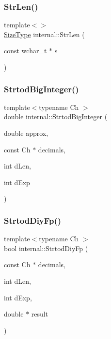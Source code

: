 \mbox{\label{namespaceinternal_a9cd1cee166f1e18e117d3ce9dc1c83da}} 
\subsubsection{\texorpdfstring{Str\+Len()}{StrLen()}\hspace{0.1cm}{\footnotesize\ttfamily [3/3]}}
{\footnotesize\ttfamily template$<$$>$ \\
\hyperlink{rapidjson_8h_a5ed6e6e67250fadbd041127e6386dcb5}{Size\+Type} internal\+::\+Str\+Len (\begin{DoxyParamCaption}\item[{const wchar\+\_\+t $\ast$}]{s }\end{DoxyParamCaption})\hspace{0.3cm}{\ttfamily [inline]}}

\mbox{\label{namespaceinternal_aa69b729bd9d047f70ba772424cfb65cb}} 
\subsubsection{\texorpdfstring{Strtod\+Big\+Integer()}{StrtodBigInteger()}}
{\footnotesize\ttfamily template$<$typename Ch $>$ \\
double internal\+::\+Strtod\+Big\+Integer (\begin{DoxyParamCaption}\item[{double}]{approx,  }\item[{const Ch $\ast$}]{decimals,  }\item[{int}]{d\+Len,  }\item[{int}]{d\+Exp }\end{DoxyParamCaption})\hspace{0.3cm}{\ttfamily [inline]}}

\mbox{\label{namespaceinternal_aab0ac7e895939a3e117ec8e3395fd334}} 
\subsubsection{\texorpdfstring{Strtod\+Diy\+Fp()}{StrtodDiyFp()}}
{\footnotesize\ttfamily template$<$typename Ch $>$ \\
bool internal\+::\+Strtod\+Diy\+Fp (\begin{DoxyParamCaption}\item[{const Ch $\ast$}]{decimals,  }\item[{int}]{d\+Len,  }\item[{int}]{d\+Exp,  }\item[{double $\ast$}]{result }\end{DoxyParamCaption})\hspace{0.3cm}{\ttfamily [inline]}}

